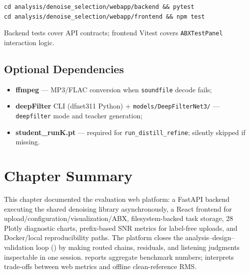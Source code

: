 \begin{verbatim}
cd analysis/denoise_selection/webapp/backend && pytest
cd analysis/denoise_selection/webapp/frontend && npm test
\end{verbatim}

Backend tests cover API contracts; frontend Vitest covers \texttt{ABXTestPanel} interaction logic.

\subsection{Optional Dependencies}

\begin{itemize}
  \item \textbf{ffmpeg} --- MP3/FLAC conversion when \texttt{soundfile} decode fails;
  \item \textbf{deepFilter} CLI (dfnet311 Python) + \texttt{models/DeepFilterNet3/} --- \texttt{deepfilter} mode and teacher generation;
  \item \textbf{student\_runK.pt} --- required for \texttt{run\_distill\_refine}; silently skipped if missing.
\end{itemize}

\section{Chapter Summary}
\label{sec:web_summary}

This chapter documented the \projectshort{} evaluation web platform: a FastAPI backend executing the shared denoising library asynchronously, a React frontend for upload/configuration/visualization/ABX, filesystem-backed task storage, 28 Plotly diagnostic charts, prefix-based SNR metrics for label-free uploads, and Docker/local reproducibility paths. The platform closes the analysis--design--validation loop () by making routed chains, residuals, and listening judgments inspectable in one session.  reports aggregate benchmark numbers;  interprets trade-offs between web metrics and offline clean-reference RMS.
